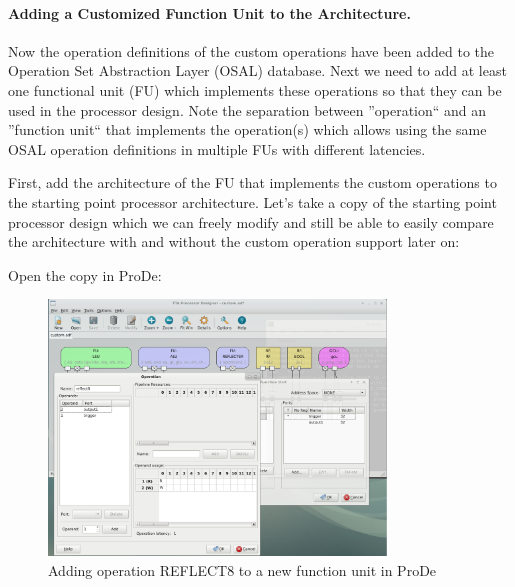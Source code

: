 \documentclass[twoside]{tceusermanual}
\begin{document}
\paragraph{Adding a Customized Function Unit to the Architecture.}

Now the operation definitions of the custom operations have been added to the
Operation Set Abstraction Layer (OSAL) database. Next we need to add at
least one functional unit (FU) which implements these operations so that they
can be used in the processor design. Note the separation between ''operation`` and
an ''function unit`` that implements the operation(s) which allows using the
same OSAL operation definitions in multiple FUs with different latencies.

First, add the architecture of the FU that implements the custom operations
to the starting point processor architecture. Let's take a copy of the starting
point processor design which we can freely modify and still be able to easily
compare the architecture with and without the custom operation support later on:


Open the copy in ProDe:


\begin{figure}
  \begin{center} \includegraphics[width=0.8\textwidth]{eps/reflecter}
  \caption{Adding operation REFLECT8 to a new function unit in ProDe} 
  \label{fig:reflecter} \end{center}
\end{figure}
\end{document}
